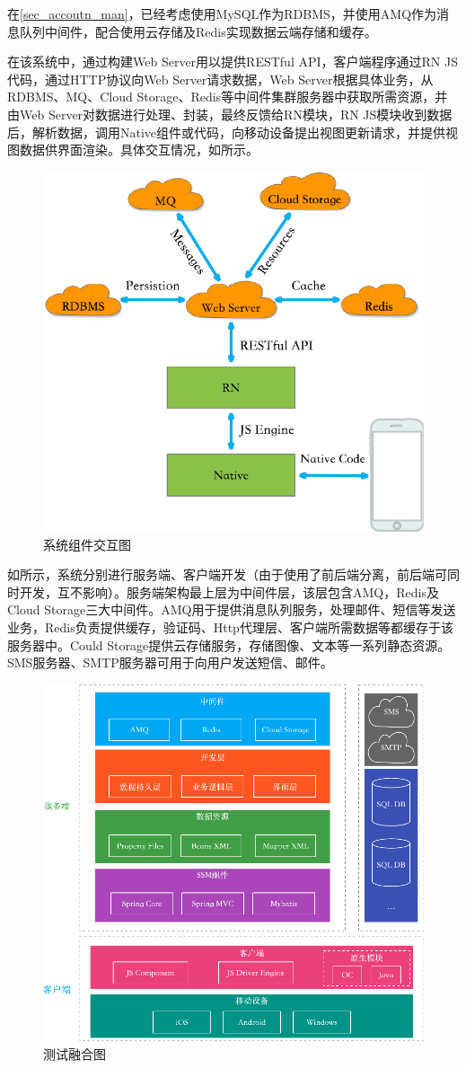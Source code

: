 \documentclass[oneside]{jufethesis}
\begin{document}
在\ref{sec_accoutn_man}，已经考虑使用MySQL作为RDBMS，并使用AMQ作为消息队列中间件，配合使用云存储及Redis实现数据云端存储和缓存。

在该系统中，通过构建Web Server用以提供RESTful API，客户端程序通过RN JS代码，通过HTTP协议向Web Server请求数据，Web Server根据具体业务，从RDBMS、MQ、Cloud Storage、Redis等中间件集群服务器中获取所需资源，并由Web Server对数据进行处理、封装，最终反馈给RN模块，RN JS模块收到数据后，解析数据，调用Native组件或代码，向移动设备提出视图更新请求，并提供视图数据供界面渲染。具体交互情况，如所示。

\begin{figure}
  \figspace
  \centering
  \includegraphics[height=0.6\columnwidth]{components.pdf}
  \caption{系统组件交互图}
  \label{fig:components}
\end{figure}


如所示，系统分别进行服务端、客户端开发（由于使用了前后端分离，前后端可同时开发，互不影响）。服务端架构最上层为中间件层，该层包含AMQ，Redis及Cloud Storage三大中间件。AMQ用于提供消息队列服务，处理邮件、短信等发送业务，Redis负责提供缓存，验证码、Http代理层、客户端所需数据等都缓存于该服务器中。Could Storage提供云存储服务，存储图像、文本等一系列静态资源。SMS服务器、SMTP服务器可用于向用户发送短信、邮件。 

\begin{figure}[htbp]
  \figspace
  \centering
  \includegraphics[height=0.8\columnwidth]{framework.pdf}
  \caption{测试融合图}
  \label{fig_2}
\end{figure}
\end{document}
